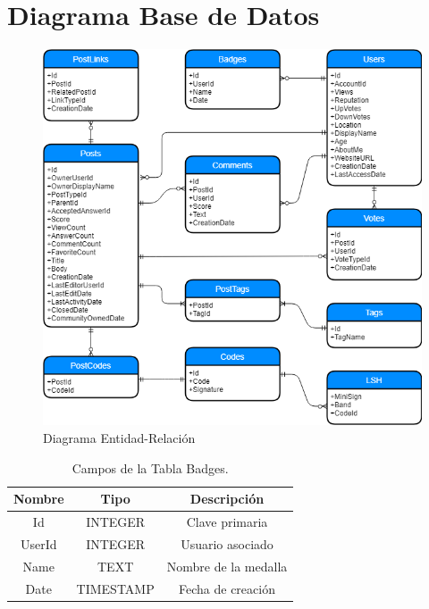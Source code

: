 \chapter{Diagrama Base de Datos}
\label{ape:diag}

\begin{figure}[h]
\centering
\includegraphics[width=36em]{img/er.png}
\caption{Diagrama Entidad-Relación}
\label{fig:er}
\end{figure}



\begin{table}[h]
\caption{Campos de la Tabla Badges.}
\centering
\begin{tabular}{ccc}
\hline
Nombre & Tipo & Descripción \\
\hline
Id & INTEGER & Clave primaria \\
UserId & INTEGER & Usuario asociado \\
Name & TEXT & Nombre de la medalla \\
Date & TIMESTAMP & Fecha de creación \\
\hline
\end{tabular}
\end{table}

